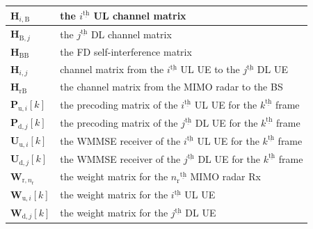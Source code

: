 \documentclass[9pt,journal]{IEEEtran}
\newcommand{\bracket}[1]{{\left [{#1}\right ]}}
\newcommand{\ith}[1]    {{#1}^{\underline{\text{th}}}}
\newcommand{\rr}{_\mathrm{r}}
\newcommand{\PiB}{\mathbf{P}_{\textrm{u},i}\bracket{k}}
\newcommand{\PBj}{\mathbf{P}_{\textrm{d},j}\bracket{k}}
\newcommand{\UiB}{\mathbf{U}_{\textrm{u},i}\bracket{k}}
\newcommand{\WiB}{\mathbf{W}_{\textrm{u},i}\bracket{k}}
\newcommand{\UBj}{\mathbf{U}_{\textrm{d},j}\bracket{k}}
\newcommand{\WBj}{\mathbf{W}_{\mathrm{d},j}\bracket{k}}
\newcommand{\Wrnr}{\mathbf{W}_{\mathrm{r},n_\mathrm{r}}}
\newcommand{\HrB}{\mathbf{H}_{\textrm{rB}}}
\newcommand{\HBj}{\mathbf{H}_{\textrm{B},j}}
\newcommand{\HBB}{\mathbf{H}_{\mathrm{BB}}}
\newcommand{\HiB}{\mathbf{H}_{i,\textrm{B}}}
\newcommand{\Hij}{\mathbf{H}_{i,j}}
\begin{document}
\begin{table}[!t]
\begin{tabular}{l||p{66mm}}
			\hline
			$\HiB$& the $\ith{i}$ UL channel matrix\\
			\hline
			$\HBj$& the $\ith{j}$ DL channel matrix\\
			\hline
			$\HBB$& the FD self-interference matrix\\
			\hline
			$\Hij$& channel matrix from the $\ith{i}$ UL UE to the $\ith{j}$ DL UE\\
			\hline
			$\HrB$& the channel matrix from the MIMO radar to the BS\\
			\hline
			$\PiB$& the precoding matrix of the $\ith{i}$ UL UE for the $\ith{k}$ frame\\
			\hline
			$\PBj$& the precoding matrix of the $\ith{j}$ DL UE for the $\ith{k}$ frame\\
			\hline
			$\UiB$& the WMMSE receiver of the $\ith{i}$ UL UE for the $\ith{k}$ frame\\
			\hline
			$\UBj$& the WMMSE receiver of the $\ith{j}$ DL UE for the $\ith{k}$ frame\\
			\hline
			$\Wrnr$& the weight matrix for the $\ith{n\rr}$ MIMO radar Rx\\
			\hline
			$\WiB$& the weight matrix for the $\ith{i}$ UL UE\\
			\hline
			$\WBj$& the weight matrix for the $\ith{j}$ DL UE\\
			\hline
		\end{tabular}
	\end{table}
\vspace{-1em}
\end{document}
